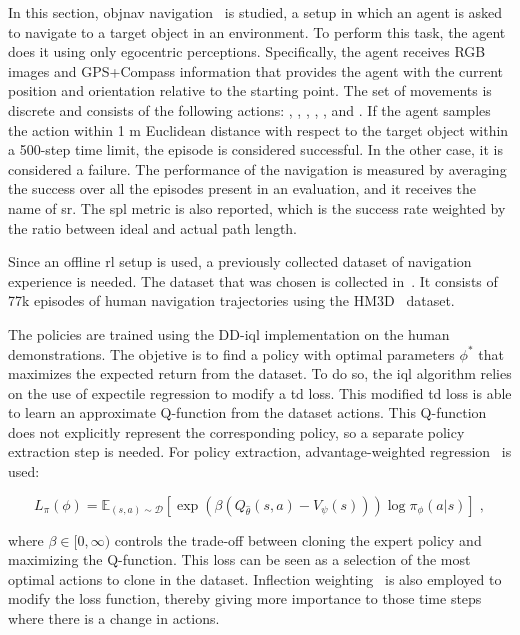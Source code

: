 In this section, \acrshort{objnav} navigation~\cite{batra2020} is studied, a setup in which an agent is asked to navigate to a target object in an environment.
To perform this task, the agent does it using only egocentric perceptions.
Specifically, the agent receives RGB images and GPS+Compass information that provides the agent with the current position and orientation relative to the starting point.
The set of movements is discrete and consists of the following actions: \turnleft, \turnright, \moveforward, \lookup, \lookdown, and \stopac.
If the agent samples the \stopac action within 1 m Euclidean distance with respect to the target object within a 500-step time limit, the episode is considered successful.
In the other case, it is considered a failure.
The performance of the navigation is measured by averaging the success over all the episodes present in an evaluation, and it receives the name of \acrfull{sr}.
The \acrfull{spl} metric is also reported, which is the success rate weighted by the ratio between ideal and actual path length.

Since an offline \acrshort{rl} setup is used, a previously collected dataset of navigation experience is needed.
The dataset that was chosen is collected in~\cite{ramrakhya2023}.
It consists of 77k episodes of human navigation trajectories using the HM3D~\cite{Ramakrishnan2021HabitatMatterport3D} dataset.

The policies are trained using the DD-\acrshort{iql} implementation on the human demonstrations.
The objetive is to find a policy with optimal parameters $\phi^*$ that maximizes the expected return from the dataset.
To do so, the \acrshort{iql} algorithm relies on the use of expectile regression to modify a \acrfull{td} loss.
This modified \acrshort{td} loss is able to learn an approximate Q-function from the dataset actions.
This Q-function does not explicitly represent the corresponding policy, so a separate policy extraction step is needed.
For policy extraction, advantage-weighted regression~\cite{peters2007, peng2019advantageweighted} is used:

\begin{equation}
    L_\pi(\phi)=\mathbb{E}_{(s, a) \sim \mathcal{D}}\left[\exp \left(\beta\left(Q_{\hat{\theta}}(s, a)-V_\psi(s)\right)\right) \log \pi_\phi(a|s)\right]\; ,
    \label{eq:loss}
\end{equation}

where $\beta \in [0, \infty)$ controls the trade-off between cloning the expert policy and maximizing the Q-function.
This loss can be seen as a selection of the most optimal actions to clone in the dataset.
Inflection weighting~\cite{wijmans2019} is also employed to modify the loss function, thereby giving more importance to those time steps where there is a change in actions.

